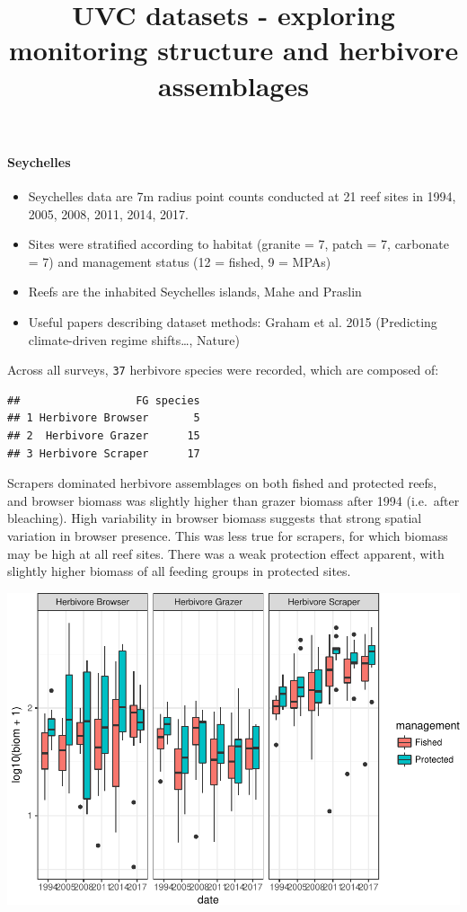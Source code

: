 \documentclass[]{article}
\title{UVC datasets - exploring monitoring structure and herbivore assemblages}
\author{}
\date{}
\providecommand{\tightlist}{%
  \setlength{\itemsep}{0pt}\setlength{\parskip}{0pt}}
\let\oldparagraph\paragraph
\renewcommand{\paragraph}[1]{\oldparagraph{#1}\mbox{}}
\begin{document}
\maketitle

\paragraph{Seychelles}\label{seychelles}

\begin{itemize}
\tightlist
\item
  Seychelles data are 7m radius point counts conducted at 21 reef sites
  in 1994, 2005, 2008, 2011, 2014, 2017.
\item
  Sites were stratified according to habitat (granite = 7, patch = 7,
  carbonate = 7) and management status (12 = fished, 9 = MPAs)
\item
  Reefs are the inhabited Seychelles islands, Mahe and Praslin
\item
  Useful papers describing dataset methods: Graham et al. 2015
  (Predicting climate-driven regime shifts\ldots{}, Nature)
\end{itemize}

Across all surveys, \texttt{37} herbivore species were recorded, which
are composed of:

\begin{verbatim}
##                  FG species
## 1 Herbivore Browser       5
## 2  Herbivore Grazer      15
## 3 Herbivore Scraper      17
\end{verbatim}

Scrapers dominated herbivore assemblages on both fished and protected
reefs, and browser biomass was slightly higher than grazer biomass after
1994 (i.e.~after bleaching). High variability in browser biomass
suggests that strong spatial variation in browser presence. This was
less true for scrapers, for which biomass may be high at all reef sites.
There was a weak protection effect apparent, with slightly higher
biomass of all feeding groups in protected sites.

\includegraphics{UVC-datasets-explore_files/figure-latex/unnamed-chunk-3-1.pdf}
\end{document}

